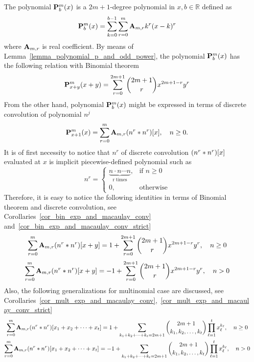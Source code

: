 The polynomial $\polynomialP{m}{b}{x}$ is a $2m+1$-degree polynomial in $x,b\in\mathbb{R}$ defined as
\begin{align*}
    \polynomialP{m}{b}{x} = \sum_{k=0}^{b-1} \sum_{r=0}^{m} \coeffA{m}{r} k^r(x-k)^r
\end{align*}
where $\coeffA{m}{r}$ is real coefficient.
By means of Lemma~\ref{lemma_polynomial_p_and_odd_power},
the polynomial $\polynomialP{m}{b}{x}$ has the following relation with Binomial theorem~\cite{AbraSteg72}
\begin{align*}
    \polynomialP{m}{x+y}{x+y} = \sum_{r=0}^{2m+1} \binom{2m+1}{r} x^{2m+1-r} y^r
\end{align*}
From the other hand, polynomial $\polynomialP{m}{b}{x}$ might be expressed in terms of discrete convolution
of polynomial $n^j$
\begin{align*}
    \polynomialP{m}{x+1}{x} = \sum_{r=0}^{m} \coeffA{m}{r} \convPower{n}{r}{x}, \quad n\geq 0.
\end{align*}
It is of first necessity to notice that  $n^r$ of discrete convolution $\convPower{n}{r}{x}$ evaluated at $x$
is implicit piecewise-defined polynomial such as
\begin{equation*}
    n^{r} =
    \begin{cases}
        \underbrace{n \cdot n \cdots n}_{\mathrm{r \; times}}, & \mbox{if } n \geq 0 \\
        0, & \mbox{otherwise}
    \end{cases}
\end{equation*}
Therefore, it is easy to notice the following identities in terms of Binomial theorem and discrete convolution,
see Corollaries~\ref{cor_bin_exp_and_macaulay_conv} and~\ref{cor_bin_exp_and_macaulay_conv_strict}
\begin{equation*}
    \sum_{r=0}^{m} \coeffA{m}{r} \convPower{n}{r}{x+y}
    =
    1 + \sum_{r=0}^{2m+1} \binom{2m+1}{r} x^{2m+1-r} y^r, \quad n \geq 0
\end{equation*}
\begin{equation*}
    \sum_{r=0}^{m} \coeffA{m}{r} \convPower{n}{r}{x+y}
    =
    -1 + \sum_{r=0}^{2m+1} \binom{2m+1}{r} x^{2m+1-r} y^r, \quad n > 0
\end{equation*}
Also, the following generalizations for multinomial case are discussed,
see Corollaries~\ref{cor_mult_exp_and_macaulay_conv},~\ref{cor_mult_exp_and_macaulay_conv_strict}
\begin{gather*}
    \sum_{r=0}^{m} \coeffA{m}{r} \convPower{n}{r}{\multifoldSum{t}} =
    1 + \sum_{\multifoldSum[k]{t}=2m+1} \binom{2m+1}{k_1, k_2,\ldots, k_t} \prod_{\ell=1}^{t} x_\ell^{k_\ell},
    \quad n \geq 0\\
    \sum_{r=0}^{m} \coeffA{m}{r} \convPower{n}{r}{\multifoldSum{t}} =
    -1 + \sum_{\multifoldSum[k]{t}=2m+1} \binom{2m+1}{k_1, k_2,\ldots, k_t} \prod_{\ell=1}^{t} x_\ell^{k_\ell},
    \quad n > 0\\
\end{gather*}
